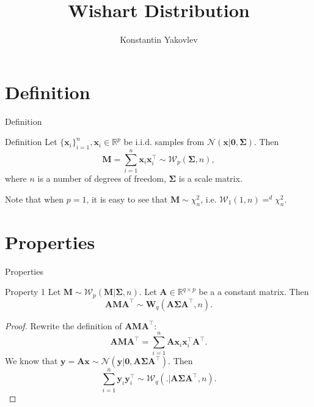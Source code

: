 \documentclass{beamer}
\title{Wishart Distribution}
\author{Konstantin Yakovlev}
\institute{MIPT, 2022}
\begin{document}
\begin{frame}
    \titlepage
\end{frame}


\begin{frame}
    \tableofcontents
\end{frame}


\section{Definition}

\begin{frame}{Definition}
    \begin{block}{Definition}
    Let $\{\mathbf{x}_i\}_{i=1}^n, \mathbf{x}_i \in \mathbb{R}^p$ be $\mathrm{i.i.d.}$ samples from
    $\mathcal{N}(\mathbf{x}|\boldsymbol{0}, \mathbf{\Sigma})$. Then
    \[
        \mathbf{M} = \sum_{i=1}^n \mathbf{x}_i\mathbf{x}_i^\top \sim \mathcal{W}_p(\mathbf{\Sigma}, n),
    \]
    where $n$ is a number of degrees of freedom, $\mathbf{\Sigma}$ is a scale matrix.
    \end{block}

    Note that when $p = 1$, it is easy to see that $\mathbf{M} \sim \chi^2_{n}$, i.e.
    $\mathcal{W}_1(1, n) =^d \chi^2_n$.

\end{frame}


\section{Properties}

\begin{frame}{Properties}
    \begin{block}{Property 1}
        Let $\mathbf{M} \sim \mathcal{W}_p(\mathbf{M}|\mathbf{\Sigma}, n)$.
        Let $\mathbf{A}\in \mathbb{R}^{q\times p}$ be a a constant matrix.
        Then
        \[
            \mathbf{A}\mathbf{M}\mathbf{A}^\top \sim \mathbf{W}_q(\mathbf{A}\mathbf{\Sigma}\mathbf{A}^\top, n).
        \]
    \end{block}
    \begin{proof}
        Rewrite the definition of $\mathbf{A}\mathbf{M}\mathbf{A}^\top$:
        \[
            \mathbf{A}\mathbf{M}\mathbf{A}^\top = \sum_{i=1}^n\mathbf{A}\mathbf{x}_i\mathbf{x}_i^\top\mathbf{A}^\top.
        \]
        We know that $\mathbf{y} = \mathbf{A}\mathbf{x} \sim \mathcal{N}(\mathbf{y}|\mathbf{0}, \mathbf{A}\mathbf{\Sigma}\mathbf{A}^\top)$. Then
        \[
            \sum_{i=1}^n\mathbf{y}_i\mathbf{y}_i^\top \sim \mathcal{W}_q(.|\mathbf{A}\mathbf{\Sigma}\mathbf{A}^\top, n).
        \]
    \end{proof}

\end{frame}
\end{document}
